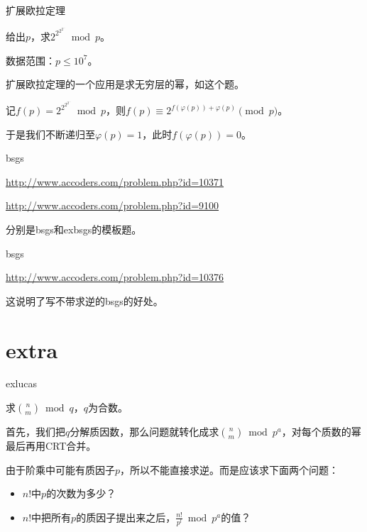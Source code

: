 \documentclass{ctexbeamer}        %
\begin{document}
\begin{frame}{扩展欧拉定理}
\begin{example}[accoders3704]
    给出$p$，求$2^{2^{2^{2^{\cdots}}}} \bmod p$。

    数据范围：$p \le 10^7$。
\end{example}
\pause
扩展欧拉定理的一个应用是求无穷层的幂，如这个题。

记$f(p)=2^{2^{2^{2^{\cdots}}}} \bmod p$，则$f(p)\equiv 2^{f(\varphi(p))+\varphi(p)} \pmod p$。

于是我们不断递归至$\varphi(p)=1$，此时$f(\varphi(p))=0$。
\end{frame}

\begin{frame}{bsgs}
\begin{example}[accoders10371 \& 9100]
    \url{http://www.accoders.com/problem.php?id=10371}

    \url{http://www.accoders.com/problem.php?id=9100}
\end{example}
分别是bsgs和exbsgs的模板题。
\end{frame}

\begin{frame}{bsgs}
\begin{example}[accoders10376]
    \url{http://www.accoders.com/problem.php?id=10376}
\end{example}
这说明了写不带求逆的bsgs的好处。
\end{frame}

\section{extra}

\begin{frame}{exlucas}

\begin{theorem}[exlucas]
	求$\binom{n}{m} \bmod q$，$q$为合数。
\end{theorem}
首先，我们把$q$分解质因数，那么问题就转化成求$\binom{n}{m} \bmod{p^a}$，对每个质数的幂最后再用CRT合并。

由于阶乘中可能有质因子$p$，所以不能直接求逆。而是应该求下面两个问题：

\begin{itemize}
    \item $n!$中$p$的次数为多少？
    \item $n!$中把所有$p$的质因子提出来之后，$\frac{n!}{p^l} \bmod p^a$的值？
\end{itemize}
\end{frame}
\end{document}
